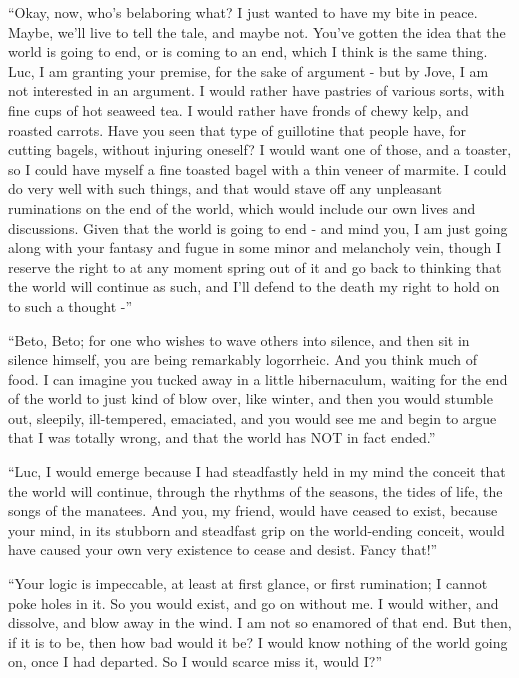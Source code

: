 ``Okay, now, who's belaboring what? I just wanted to have my bite in
peace. Maybe, we'll live to tell the tale, and maybe not. You've gotten
the idea that the world is going to end, or is coming to an end, which I
think is the same thing. Luc, I am granting your premise, for the sake
of argument - but by Jove, I am not interested in an argument. I would
rather have pastries of various sorts, with fine cups of hot seaweed
tea. I would rather have fronds of chewy kelp, and roasted carrots. Have
you seen that type of guillotine that people have, for cutting bagels,
without injuring oneself? I would want one of those, and a toaster, so I
could have myself a fine toasted bagel with a thin veneer of marmite. I
could do very well with such things, and that would stave off any
unpleasant ruminations on the end of the world, which would include our
own lives and discussions. Given that the world is going to end - and
mind you, I am just going along with your fantasy and fugue in some
minor and melancholy vein, though I reserve the right to at any moment
spring out of it and go back to thinking that the world will continue as
such, and I'll defend to the death my right to hold on to such a thought
-''

``Beto, Beto; for one who wishes to wave others into silence, and then
sit in silence himself, you are being remarkably logorrheic. And you
think much of food. I can imagine you tucked away in a little
hibernaculum, waiting for the end of the world to just kind of blow
over, like winter, and then you would stumble out, sleepily,
ill-tempered, emaciated, and you would see me and begin to argue that I
was totally wrong, and that the world has NOT in fact ended.''

``Luc, I would emerge because I had steadfastly held in my mind the
conceit that the world will continue, through the rhythms of the
seasons, the tides of life, the songs of the manatees. And you, my
friend, would have ceased to exist, because your mind, in its stubborn
and steadfast grip on the world-ending conceit, would have caused your
own very existence to cease and desist. Fancy that!''

``Your logic is impeccable, at least at first glance, or first
rumination; I cannot poke holes in it. So you would exist, and go on
without me. I would wither, and dissolve, and blow away in the wind. I
am not so enamored of that end. But then, if it is to be, then how bad
would it be? I would know nothing of the world going on, once I had
departed. So I would scarce miss it, would I?''

